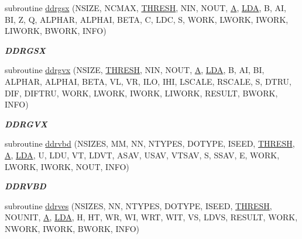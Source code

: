 \begin{DoxyCompactItemize}
subroutine \hyperlink{group__double__eig_ga5408eea13bb949e9ff502a7dfd447954}{ddrgsx} (N\+S\+I\+Z\+E, N\+C\+M\+A\+X, \hyperlink{zlaqgs_8c_a0656018abfc9fa2821827415f5d5ea57}{T\+H\+R\+E\+S\+H}, N\+I\+N, N\+O\+U\+T, \hyperlink{classA}{A}, \hyperlink{example__user_8c_ae946da542ce0db94dced19b2ecefd1aa}{L\+D\+A}, B, A\+I, B\+I, Z, Q, A\+L\+P\+H\+A\+R, A\+L\+P\+H\+A\+I, B\+E\+T\+A, C, L\+D\+C, S, W\+O\+R\+K, L\+W\+O\+R\+K, I\+W\+O\+R\+K, L\+I\+W\+O\+R\+K, B\+W\+O\+R\+K, I\+N\+F\+O)
\begin{DoxyCompactList}\small\item\em {\bfseries D\+D\+R\+G\+S\+X} \end{DoxyCompactList}\item 
subroutine \hyperlink{group__double__eig_ga12fe443f6eebc293d99eae77fa84d9c5}{ddrgvx} (N\+S\+I\+Z\+E, \hyperlink{zlaqgs_8c_a0656018abfc9fa2821827415f5d5ea57}{T\+H\+R\+E\+S\+H}, N\+I\+N, N\+O\+U\+T, \hyperlink{classA}{A}, \hyperlink{example__user_8c_ae946da542ce0db94dced19b2ecefd1aa}{L\+D\+A}, B, A\+I, B\+I, A\+L\+P\+H\+A\+R, A\+L\+P\+H\+A\+I, B\+E\+T\+A, V\+L, V\+R, I\+L\+O, I\+H\+I, L\+S\+C\+A\+L\+E, R\+S\+C\+A\+L\+E, S, D\+T\+R\+U, D\+I\+F, D\+I\+F\+T\+R\+U, W\+O\+R\+K, L\+W\+O\+R\+K, I\+W\+O\+R\+K, L\+I\+W\+O\+R\+K, R\+E\+S\+U\+L\+T, B\+W\+O\+R\+K, I\+N\+F\+O)
\begin{DoxyCompactList}\small\item\em {\bfseries D\+D\+R\+G\+V\+X} \end{DoxyCompactList}\item 
subroutine \hyperlink{group__double__eig_ga154b2caeffc955bb3dede4c310ca3cd6}{ddrvbd} (N\+S\+I\+Z\+E\+S, M\+M, N\+N, N\+T\+Y\+P\+E\+S, D\+O\+T\+Y\+P\+E, I\+S\+E\+E\+D, \hyperlink{zlaqgs_8c_a0656018abfc9fa2821827415f5d5ea57}{T\+H\+R\+E\+S\+H}, \hyperlink{classA}{A}, \hyperlink{example__user_8c_ae946da542ce0db94dced19b2ecefd1aa}{L\+D\+A}, U, L\+D\+U, V\+T, L\+D\+V\+T, A\+S\+A\+V, U\+S\+A\+V, V\+T\+S\+A\+V, S, S\+S\+A\+V, E, W\+O\+R\+K, L\+W\+O\+R\+K, I\+W\+O\+R\+K, N\+O\+U\+T, I\+N\+F\+O)
\begin{DoxyCompactList}\small\item\em {\bfseries D\+D\+R\+V\+B\+D} \end{DoxyCompactList}\item 
subroutine \hyperlink{group__double__eig_ga8ffc2a465b9b10ab80fc13e6197d0dc3}{ddrves} (N\+S\+I\+Z\+E\+S, N\+N, N\+T\+Y\+P\+E\+S, D\+O\+T\+Y\+P\+E, I\+S\+E\+E\+D, \hyperlink{zlaqgs_8c_a0656018abfc9fa2821827415f5d5ea57}{T\+H\+R\+E\+S\+H}, N\+O\+U\+N\+I\+T, \hyperlink{classA}{A}, \hyperlink{example__user_8c_ae946da542ce0db94dced19b2ecefd1aa}{L\+D\+A}, H, H\+T, W\+R, W\+I, W\+R\+T, W\+I\+T, V\+S, L\+D\+V\+S, R\+E\+S\+U\+L\+T, W\+O\+R\+K, N\+W\+O\+R\+K, I\+W\+O\+R\+K, B\+W\+O\+R\+K, I\+N\+F\+O)

\end{DoxyCompactItemize}
